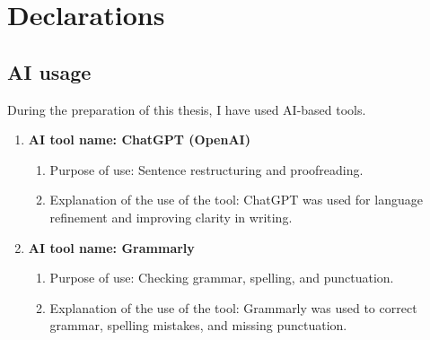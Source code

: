 \section*{Declarations}

\subsection*{AI usage}

During the preparation of this thesis, I have used AI-based tools.

\begin{enumerate}
    \item \textbf{AI tool name: ChatGPT (OpenAI)}
    
    \begin{enumerate}
        \item Purpose of use: Sentence restructuring and proofreading.
        
        \item Explanation of the use of the tool: ChatGPT was used for language refinement and improving clarity in writing.
    \end{enumerate}
    
    \item \textbf{AI tool name: Grammarly}
    
    \begin{enumerate}
        \item Purpose of use: Checking grammar, spelling, and punctuation.
        
        \item Explanation of the use of the tool: Grammarly was used to correct grammar, spelling mistakes, and missing punctuation.
    \end{enumerate}
\end{enumerate}